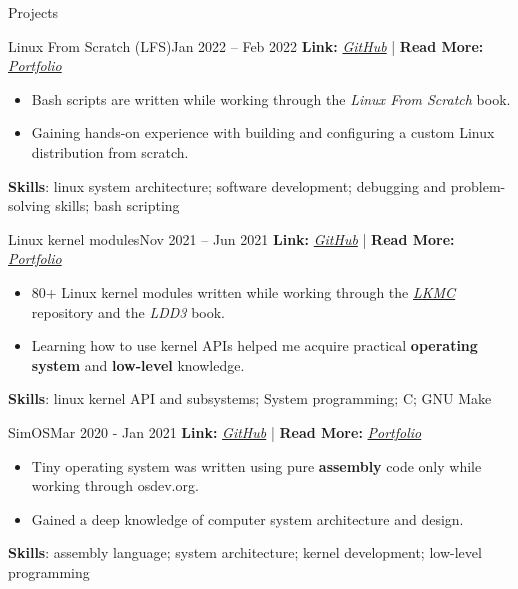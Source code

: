 \documentclass[]{Sohaib-Mohamed}
\begin{document}
\begin{cvsection}{Projects}

   \begin{cvsubsection}{Linux From Scratch (LFS)}{}{Jan 2022 -- Feb 2022}
      \textbf{Link:} \href{https://github.com/smalinux/LFS}{\textit{GitHub}} | \textbf{Read More:} \href{https://gist.github.com/smalinux/2e9c5537fdac65501a655280352c9c15#linux-from-scratch-lfs}{\textit{Portfolio}}
      \begin{itemize}
         \item Bash scripts are written while working through the \textit{Linux From Scratch} book.
         \item Gaining hands-on experience with building and configuring a custom Linux distribution from scratch.
      \end{itemize}
      \textbf{Skills}: linux system architecture; software development; debugging and problem-solving skills; bash scripting
   \end{cvsubsection}

   \begin{cvsubsection}{Linux kernel modules}{}{Nov 2021 -- Jun 2021}
      \textbf{Link:} \href{https://github.com/smalinux/linux-kernel-modules-lab}{\textit{GitHub}} | \textbf{Read More:} \href{https://gist.github.com/smalinux/2e9c5537fdac65501a655280352c9c15#linux-kernel-modules}{\textit{Portfolio}}
      \begin{itemize}
         \item 80+ Linux kernel modules written while working through the \href{https://github.com/cirosantilli/linux-kernel-module-cheat}{\textit{LKMC}} repository and the \textit{LDD3} book.
         \item Learning how to use kernel APIs helped me acquire practical \textbf{operating system} and \textbf{low-level} knowledge.
      \end{itemize}
      \textbf{Skills}: linux kernel API and subsystems; System programming; C; GNU Make
   \end{cvsubsection}

   \begin{cvsubsection}{SimOS}{}{Mar 2020 - Jan 2021}
      \textbf{Link:} \href{https://github.com/smalinux/simOS}{\textit{GitHub}} | \textbf{Read More:} \href{https://gist.github.com/smalinux/2e9c5537fdac65501a655280352c9c15#simos}{\textit{Portfolio}}
      \begin{itemize}
         \item Tiny operating system was written using pure \textbf{assembly} code only while working through osdev.org.
         \item Gained a deep knowledge of computer system architecture and design.
      \end{itemize}
      \textbf{Skills}: assembly language; system architecture; kernel development; low-level programming
   \end{cvsubsection}
\end{cvsection}
\end{document}
